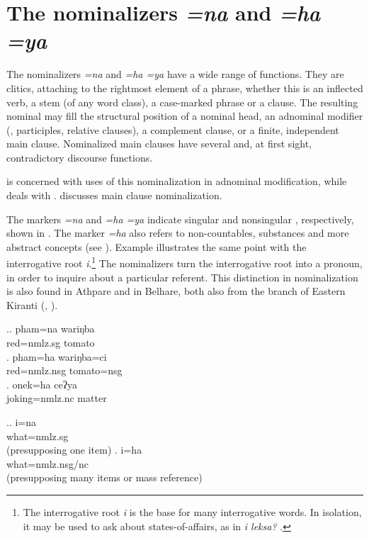  
\section{The nominalizers \emph{=na} and \emph{=ha \ti =ya} }\label{nmlz-uni}

The nominalizers \emph{=na} and \emph{=ha \ti =ya}  have a wide range of functions. They are clitics, attaching to the rightmost element of a phrase, whether this is an inflected verb, a stem (of any word class), a case-marked phrase or a clause. The resulting nominal may  fill the structural position of a nominal head, an adnominal modifier (, participles, relative clauses), a complement clause, or a finite,  independent  main clause. Nominalized main clauses have several and, at first sight, contradictory discourse functions.

 is concerned with uses of this nominalization in adnominal modification, while  deals with .  discusses main clause nominalization.


The markers \emph{=na} and \emph{=ha \ti =ya} indicate singular and nonsingular , respectively, shown in \Next. The marker \emph{=ha} also refers to non-countables, substances and more abstract concepts (see \Next[c]). Example \NNext illustrates the same point with the interrogative root \emph{i}.\footnote{The interrogative root \emph{i} is the base for many interrogative words. In isolation, it may be used to ask about states-of-affairs, as in  \emph{i leksa?} .} The nominalizers turn the interrogative root into a pronoun, in order to inquire about a particular referent. This  distinction in nominalization is also found in Athpare and in Belhare, both also from the  branch of Eastern Kiranti (\citealt[130]{Ebert1997A-grammar}, \citealt[278]{Bickel1999Nominalization}).


\ex.\ag. pham=na wariŋba\\
red{\sc =nmlz.sg} tomato\\
\bg. pham=ha wariŋba=ci\\
red{\sc =nmlz.nsg} tomato{\sc =nsg}\\
\bg. onek=ha ceʔya\\
joking{\sc =nmlz.nc} matter\\

\ex.\ag. i=na\\
what{\sc =nmlz.sg}\\
 (presupposing one item)
\bg. i=ha\\
what{\sc =nmlz.nsg/nc}\\
 (presupposing many items or mass reference)

